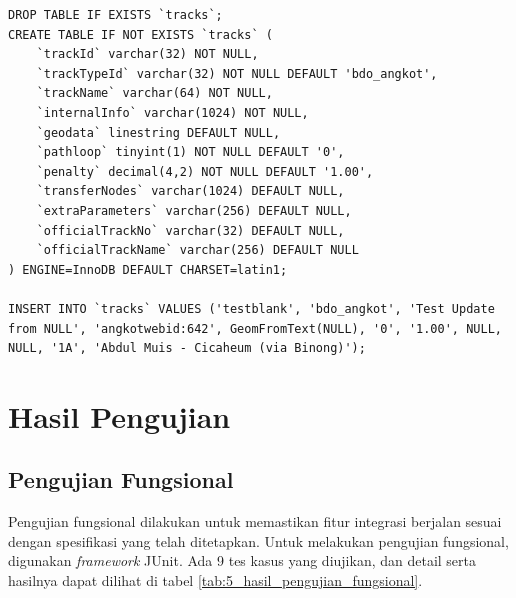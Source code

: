 \begin{lstlisting}
DROP TABLE IF EXISTS `tracks`;
CREATE TABLE IF NOT EXISTS `tracks` (
	`trackId` varchar(32) NOT NULL,
	`trackTypeId` varchar(32) NOT NULL DEFAULT 'bdo_angkot',
	`trackName` varchar(64) NOT NULL,
	`internalInfo` varchar(1024) NOT NULL,
	`geodata` linestring DEFAULT NULL,
	`pathloop` tinyint(1) NOT NULL DEFAULT '0',
	`penalty` decimal(4,2) NOT NULL DEFAULT '1.00',
	`transferNodes` varchar(1024) DEFAULT NULL,
	`extraParameters` varchar(256) DEFAULT NULL,
	`officialTrackNo` varchar(32) DEFAULT NULL,
	`officialTrackName` varchar(256) DEFAULT NULL
) ENGINE=InnoDB DEFAULT CHARSET=latin1;

INSERT INTO `tracks` VALUES ('testblank', 'bdo_angkot', 'Test Update from NULL', 'angkotwebid:642', GeomFromText(NULL), '0', '1.00', NULL, NULL, '1A', 'Abdul Muis - Cicaheum (via Binong)');
\end{lstlisting}

\section{Hasil Pengujian}

\subsection{Pengujian Fungsional}

Pengujian fungsional dilakukan untuk memastikan fitur integrasi berjalan sesuai dengan spesifikasi yang telah ditetapkan. Untuk melakukan pengujian fungsional, digunakan \textit{framework} JUnit\cite{junit}. Ada 9 tes kasus yang diujikan, dan detail serta hasilnya dapat dilihat di tabel \ref{tab:5_hasil_pengujian_fungsional}.

